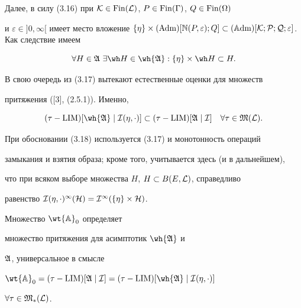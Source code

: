Далее, в силу (3.16) при $\cal K\in


\Fin(\cal L)$, $P\in\Fin(\Gamma)$, $Q\in\Fin(\Omega)$


и $\varepsilon\in]0,\infty[$ имеет место вложение $\{\eta\} \times


(\Adm)[\Bbb N(P,\varepsilon);Q]\subset(\ADM)[\cal K;


P;Q;\varepsilon]$. Как следствие имеем


\begin{equation}


\forall H\in \frak A\ \exists \wh H\in \wh{\frak A}:


\{\eta\}\times\wh H\subset H.


\end{equation}


В свою очередь из (3.17) вытекают естественные оценки для множеств


притяжения ([3], (2.5.1)). Именно, 


\begin{equation}


(\tau-\LIM)[\wh{\frak A}\mid\cal I(\eta,\cdot)] \subset


(\tau-\LIM)[\frak A\mid\cal I]\quad


\forall\tau\in\frak M(\cal L).


\end{equation}


При обосновании (3.18) используется (3.17) и монотонность операций


замыкания и взятия образа; кроме того, учитывается здесь (и в дальнейшем),


что при всяком выборе множества $H$, $H \subset B(E,\cal L)$, справедливо


равенство $\cal I(\eta,\cdot)^1(H)=\cal I^1(\{\eta\} \times


H)$.





\begin{thmnonum} Множество $\wt{\Bbb A}_0$ определяет


множество притяжения для асимптотик $\wh{\frak A}$ и


$\frak A$, универсальное в смысле


$\wt{\Bbb A}_0=(\tau-\LIM)[\frak A\mid\cal I] =


(\tau-\LIM)[\wh{\frak A} \mid \cal I(\eta,\cdot)]$


$\forall\tau\in\frak M_*(\cal L)$.


\end{thmnonum}





